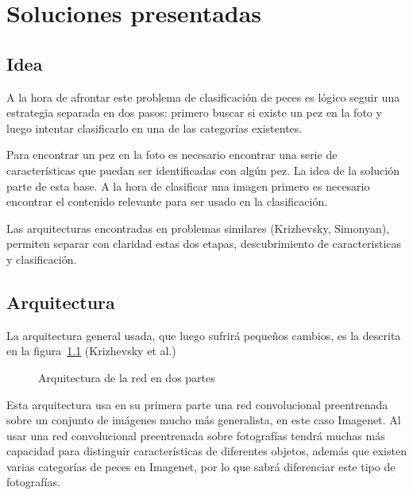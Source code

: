 
\chapter{Soluciones presentadas} %

\label{ChapterX} %

\section{Idea}
A la hora de afrontar este problema de clasificación de peces es lógico
seguir una estrategia separada en dos pasos: primero buscar si
existe un pez en la foto y luego intentar clasificarlo en una de las 
categorías existentes. 

Para encontrar un pez en la foto es necesario encontrar una serie de
características que puedan ser identificadas con algún pez. La idea de 
la solución parte de esta base. A la hora de clasificar una imagen
primero es necesario encontrar el contenido relevante para ser usado
en la clasificación.

Las arquitecturas encontradas en problemas similares (Krizhevsky, Simonyan),
permiten separar con claridad estas dos etapas, descubrimiento de
caracteristicas y clasificación.

\section{Arquitectura}

La arquitectura general usada, que luego sufrirá pequeños cambios, es la descrita en la figura~\ref{general-architecture} (Krizhevsky et al.)

\begin{figure}
  \caption{Arquitectura de la red en dos partes}
\label{general-architecture}
\end{figure}

Esta arquitectura usa en su primera parte una red convolucional preentrenada sobre un conjunto de imágenes mucho más generalista, en este caso Imagenet. Al usar una red convolucional preentrenada sobre fotografías tendrá muchas más capacidad para distinguir características de diferentes objetos, además que existen varias categorías de peces en Imagenet, por lo que sabrá diferenciar este tipo de fotografías.


